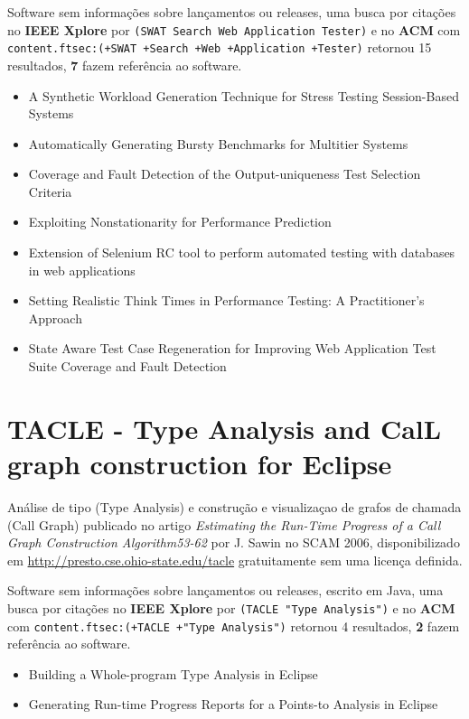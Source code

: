 Software sem informações sobre lançamentos ou releases,
uma busca por citações no {\bf IEEE Xplore} por
\texttt{(SWAT Search Web Application Tester)}
e no {\bf ACM} com
\texttt{content.ftsec:(+SWAT +Search +Web +Application +Tester)}
retornou
15 resultados,
{\bf 7} fazem referência ao software.

\begin{itemize}
\item A Synthetic Workload Generation Technique for Stress Testing Session-Based Systems
\item Automatically Generating Bursty Benchmarks for Multitier Systems
\item Coverage and Fault Detection of the Output-uniqueness Test Selection Criteria
\item Exploiting Nonstationarity for Performance Prediction
\item Extension of Selenium RC tool to perform automated testing with databases in web applications
\item Setting Realistic Think Times in Performance Testing: A Practitioner's Approach
\item State Aware Test Case Regeneration for Improving Web Application Test Suite Coverage and Fault Detection
\end{itemize}

\section{TACLE - Type Analysis and CalL graph construction for Eclipse}

Análise de tipo (Type Analysis) e construção e visualizaçao de grafos de chamada (Call Graph)
publicado no artigo {\it Estimating the Run-Time Progress of a Call Graph Construction Algorithm53-62}
por J. Sawin
no SCAM 2006,
disponibilizado em \url{http://presto.cse.ohio-state.edu/tacle}
gratuitamente
sem uma licença definida.

Software sem informações sobre lançamentos ou releases,
escrito em Java,
uma busca por citações no {\bf IEEE Xplore} por
\texttt{(TACLE "Type Analysis")}
e no {\bf ACM} com
\texttt{content.ftsec:(+TACLE +"Type Analysis")}
retornou
4 resultados,
{\bf 2} fazem referência ao software.

\begin{itemize}
\item Building a Whole-program Type Analysis in Eclipse
\item Generating Run-time Progress Reports for a Points-to Analysis in Eclipse
\end{itemize}

